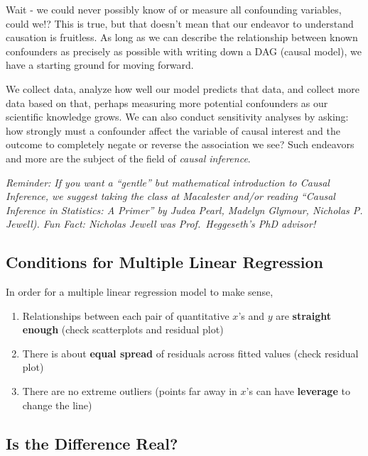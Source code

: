 \documentclass[]{book}
\providecommand{\tightlist}{%
  \setlength{\itemsep}{0pt}\setlength{\parskip}{0pt}}
\begin{document}
Wait - we could never possibly know of or measure all confounding variables, could we!? This is true, but that doesn't mean that our endeavor to understand causation is fruitless. As long as we can describe the relationship between known confounders as precisely as possible with writing down a DAG (causal model), we have a starting ground for moving forward.

We collect data, analyze how well our model predicts that data, and collect more data based on that, perhaps measuring more potential confounders as our scientific knowledge grows. We can also conduct sensitivity analyses by asking: how strongly must a confounder affect the variable of causal interest and the outcome to completely negate or reverse the association we see? Such endeavors and more are the subject of the field of \emph{causal inference}.

\emph{Reminder: If you want a ``gentle'' but mathematical introduction to Causal Inference, we suggest taking the class at Macalester and/or reading ``Causal Inference in Statistics: A Primer'' by Judea Pearl, Madelyn Glymour, Nicholas P. Jewell). Fun Fact: Nicholas Jewell was Prof.~Heggeseth's PhD advisor!}

\hypertarget{conditions-for-multiple-linear-regression}{%
\subsection{Conditions for Multiple Linear Regression}\label{conditions-for-multiple-linear-regression}}

In order for a multiple linear regression model to make sense,

\begin{enumerate}
\def\labelenumi{\arabic{enumi}.}
\tightlist
\item
  Relationships between each pair of quantitative \(x\)'s and \(y\) are \textbf{straight enough} (check scatterplots and residual plot)
\item
  There is about \textbf{equal spread} of residuals across fitted values (check residual plot)
\item
  There are no extreme outliers (points far away in \(x\)'s can have \textbf{leverage} to change the line)
\end{enumerate}

\hypertarget{is-the-difference-real}{%
\subsection{Is the Difference Real?}\label{is-the-difference-real}}
\end{document}
